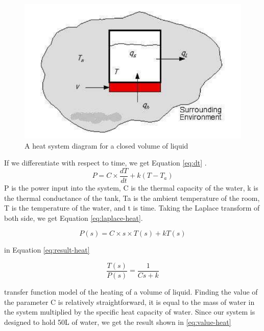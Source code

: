 \documentclass{article}
\begin{document}
\begin{figure}[H]
\begin{center}
\includegraphics[scale=0.30]{heat-system-diagram.png}
\caption{A heat system diagram for a closed volume of liquid}
\label{fig:heat-system-diagram}
\end{center}
\end{figure}

If we differentiate with respect to time, we get Equation \ref{eq:dt} \cite{heat-modelling}.
\begin{equation}
P = C \times \frac{dT}{dt} + k(T - T_{a})
\label{eq:dt}
\end{equation}
 P is the power input into the system, C is the thermal capacity of the water, k is the thermal conductance of the tank, Ta is the ambient temperature of the room, T is the temperature of the water, and t is time. Taking the Laplace transform of both side, we get Equation \ref{eq:laplace-heat}.

\begin{equation}
P(s) = C \times s \times T(s) + kT(s)
\label{eq:laplace-heat}
\end{equation}

 in Equation \ref{eq:result-heat}

\begin{equation}
\frac{T(s)}{P(s)} = \frac{1}{Cs + k}
\label{eq:result-heat}
\end{equation}

 transfer function model of the heating of a volume of liquid. Finding the value of the parameter C is relatively straightforward, it is equal to the mass of water in the system multiplied by the specific heat capacity of water. Since our system is designed to hold 50L of water, we get the result shown in \ref{eq:value-heat}
\end{document}
